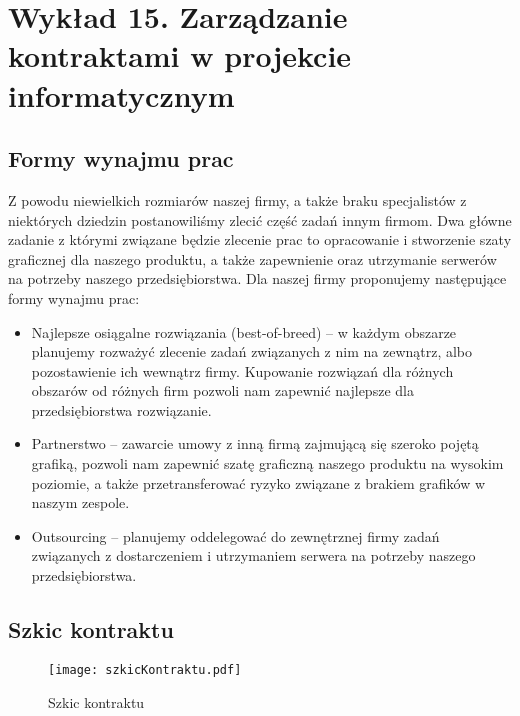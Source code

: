 \chapter{Wykład 15. Zarządzanie kontraktami w projekcie informatycznym}

\section{Formy wynajmu prac}

Z powodu niewielkich rozmiarów naszej firmy, a także braku specjalistów z niektórych dziedzin postanowiliśmy zlecić część zadań innym firmom. Dwa główne zadanie z którymi związane będzie zlecenie prac to opracowanie i stworzenie szaty graficznej dla naszego produktu, a także zapewnienie oraz utrzymanie serwerów na potrzeby naszego przedsiębiorstwa. Dla naszej firmy proponujemy następujące formy wynajmu prac:
\begin{itemize}
\item Najlepsze osiągalne rozwiązania (best-of-breed) – w każdym obszarze planujemy rozważyć zlecenie zadań związanych z nim na zewnątrz, albo pozostawienie ich wewnątrz firmy. Kupowanie rozwiązań dla różnych obszarów od różnych firm pozwoli nam zapewnić najlepsze dla przedsiębiorstwa rozwiązanie.
\item Partnerstwo – zawarcie umowy z inną firmą zajmującą się szeroko pojętą grafiką, pozwoli nam zapewnić szatę graficzną naszego produktu na wysokim poziomie, a także przetransferować ryzyko związane z brakiem grafików w naszym zespole.
\item Outsourcing – planujemy oddelegować do zewnętrznej firmy zadań związanych z dostarczeniem i utrzymaniem serwera na potrzeby naszego przedsiębiorstwa.
\end{itemize}



\section{Szkic kontraktu}

\begin{figure}[!h]
\centering
\texttt{[image: szkicKontraktu.pdf]}
\caption{Szkic kontraktu}
\label{fig:szkicKontraktu}
\end{figure}


